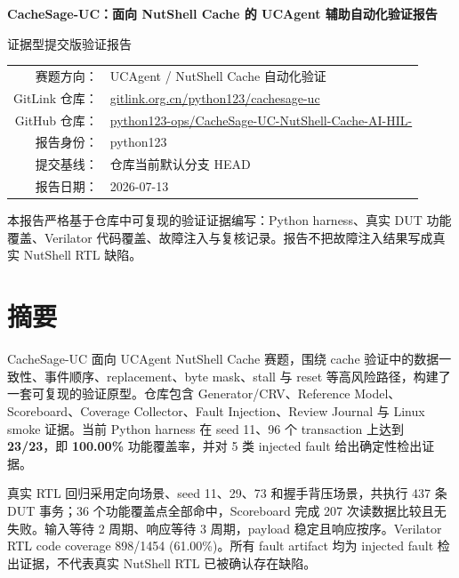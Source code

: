 \documentclass[UTF8,fontset=windows,zihao=-4]{ctexart}
\newcommand{\tightsection}[1]{\section{#1}\vspace{-0.2em}}
\begin{document}
\hfuzz=10000pt
\vfuzz=10000pt

\begin{titlepage}
\centering
\vspace*{1.0cm}
{\bfseries CacheSage-UC：面向 NutShell Cache 的 UCAgent 辅助自动化验证报告\par}
\vspace{1.2cm}
{ 证据型提交版验证报告\par}
\vspace{1.5cm}
\begin{tabular}{rl}
赛题方向： & UCAgent / NutShell Cache 自动化验证 \\
GitLink 仓库： & \href{https://gitlink.org.cn/python123/cachesage-uc}{gitlink.org.cn/python123/cachesage-uc} \\
GitHub 仓库： & \href{https://github.com/python123-ops/CacheSage-UC-NutShell-Cache-AI-HIL-}{python123-ops/CacheSage-UC-NutShell-Cache-AI-HIL-} \\
报告身份： & python123 \\
提交基线： & 仓库当前默认分支 HEAD \\
报告日期： & 2026-07-13 \\
\end{tabular}
\vfill
\colorbox{CacheGray}{\parbox{0.86\linewidth}{\centering
本报告严格基于仓库中可复现的验证证据编写：Python harness、真实 DUT 功能覆盖、Verilator 代码覆盖、故障注入与复核记录。报告不把故障注入结果写成真实 NutShell RTL 缺陷。
}}
\vspace*{1.0cm}
\end{titlepage}

\tableofcontents
\newpage

\tightsection{摘要}
CacheSage-UC 面向 UCAgent NutShell Cache 赛题，围绕 cache 验证中的数据一致性、事件顺序、replacement、byte mask、stall 与 reset 等高风险路径，构建了一套可复现的验证原型。仓库包含 Generator/CRV、Reference Model、Scoreboard、Coverage Collector、Fault Injection、Review Journal 与 Linux smoke 证据。当前 Python harness 在 seed 11、96 个 transaction 上达到 \textbf{23/23}，即 \textbf{100.00\%} 功能覆盖率，并对 5 类 injected fault 给出确定性检出证据。

真实 RTL 回归采用定向场景、seed 11、29、73 和握手背压场景，共执行 437 条 DUT 事务；36 个功能覆盖点全部命中，Scoreboard 完成 207 次读数据比较且无失败。输入等待 2 周期、响应等待 3 周期，payload 稳定且响应按序。Verilator RTL code coverage 898/1454 (61.00\%)。所有 fault artifact 均为 injected fault 检出证据，不代表真实 NutShell RTL 已被确认存在缺陷。
\end{document}
